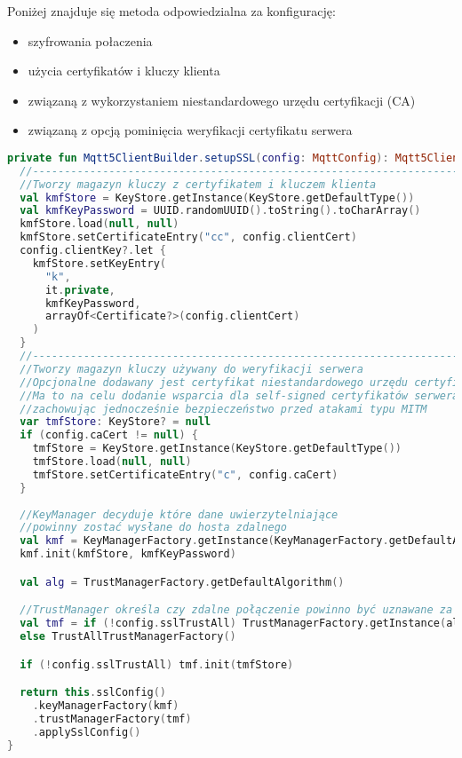 \newpage

Poniżej znajduje się metoda odpowiedzialna za konfigurację:
\begin{itemize}[leftmargin=*]
  \item szyfrowania połaczenia
  \item użycia certyfikatów i kluczy klienta
  \item związaną z wykorzystaniem niestandardowego urzędu certyfikacji (CA)
  \item związaną z opcją pominięcia weryfikacji certyfikatu serwera 
\end{itemize}

\begin{lstlisting}[language=Kotlin]
private fun Mqtt5ClientBuilder.setupSSL(config: MqttConfig): Mqtt5ClientBuilder {
  //---------------------------------------------------------------------------
  //Tworzy magazyn kluczy z certyfikatem i kluczem klienta
  val kmfStore = KeyStore.getInstance(KeyStore.getDefaultType())
  val kmfKeyPassword = UUID.randomUUID().toString().toCharArray()
  kmfStore.load(null, null)
  kmfStore.setCertificateEntry("cc", config.clientCert)
  config.clientKey?.let {
    kmfStore.setKeyEntry(
      "k",
      it.private,
      kmfKeyPassword,
      arrayOf<Certificate?>(config.clientCert)
    )
  }
  //---------------------------------------------------------------------------
  //Tworzy magazyn kluczy używany do weryfikacji serwera
  //Opcjonalne dodawany jest certyfikat niestandardowego urzędu certyfikacji
  //Ma to na celu dodanie wsparcia dla self-signed certyfikatów serwera
  //zachowując jednocześnie bezpieczeństwo przed atakami typu MITM
  var tmfStore: KeyStore? = null
  if (config.caCert != null) {
    tmfStore = KeyStore.getInstance(KeyStore.getDefaultType())
    tmfStore.load(null, null)
    tmfStore.setCertificateEntry("c", config.caCert)
  }
  
  //KeyManager decyduje które dane uwierzytelniające
  //powinny zostać wysłane do hosta zdalnego
  val kmf = KeyManagerFactory.getInstance(KeyManagerFactory.getDefaultAlgorithm())
  kmf.init(kmfStore, kmfKeyPassword)

  val alg = TrustManagerFactory.getDefaultAlgorithm()

  //TrustManager określa czy zdalne połączenie powinno być uznawane za zaufane
  val tmf = if (!config.sslTrustAll) TrustManagerFactory.getInstance(alg)
  else TrustAllTrustManagerFactory()

  if (!config.sslTrustAll) tmf.init(tmfStore)

  return this.sslConfig()
    .keyManagerFactory(kmf)
    .trustManagerFactory(tmf)
    .applySslConfig()
}
\end{lstlisting}


